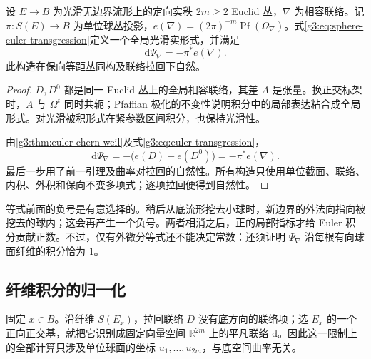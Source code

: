 \begin{proposition}\label{g3:prop:sphere-euler-transgression-differential}
	设 \(E\to B\) 为光滑无边界流形上的定向实秩 \(2m\ge2\) Euclid 丛，\(\nabla\) 为相容联络。记 \(\pi:S(E)\to B\) 为单位球丛投影，\(e(\nabla)=(2\pi)^{-m}\operatorname{Pf}(\Omega_\nabla)\)。式\eqref{g3:eq:sphere-euler-transgression}定义一个全局光滑实形式，并满足
	\begin{equation}\label{g3:eq:sphere-euler-transgression-differential}
		\mathrm d\Psi_\nabla=-\pi^*e(\nabla).
	\end{equation}
	此构造在保向等距丛同构及联络拉回下自然。
\end{proposition}
\begin{proof}
	\(D,D^0\) 都是同一 Euclid 丛上的全局相容联络，其差 \(A\) 是张量。换正交标架时，\(A\) 与 \(\Omega^t\) 同时共轭；Pfaffian 极化的不变性说明积分中的局部表达粘合成全局形式。对光滑被积形式在紧参数区间积分，也保持光滑性。

	由\cref{g3:thm:euler-chern-weil}及式\eqref{g3:eq:euler-transgression}，
	\[
		\mathrm d\Psi_\nabla
		=-\bigl(e(D)-e(D^0)\bigr)
		=-\pi^*e(\nabla).
	\]
	最后一步用了前一引理及曲率对拉回的自然性。所有构造只使用单位截面、联络、内积、外积和保向不变多项式；逐项拉回便得到自然性。
\end{proof}

等式前面的负号是有意选择的。稍后从底流形挖去小球时，新边界的外法向指向被挖去的球内；这会再产生一个负号。两者相消之后，正的局部指标才给 Euler 积分贡献正数。不过，仅有外微分等式还不能决定常数：还须证明 \(\Psi_\nabla\) 沿每根有向球面纤维的积分恰为 \(1\)。

\subsection{纤维积分的归一化}
\label{g3:subsec:1702:03}
固定 \(x\in B\)。沿纤维 \(S(E_x)\)，拉回联络 \(D\) 没有底方向的联络项；选 \(E_x\) 的一个正向正交基，就把它识别成固定向量空间 \(\mathbb R^{2m}\) 上的平凡联络 \(\mathrm d\)。因此这一限制上的全部计算只涉及单位球面的坐标 \(u_1,\ldots,u_{2m}\)，与底空间曲率无关。


